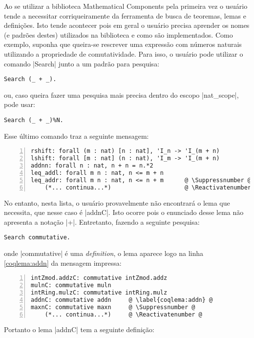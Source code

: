 Ao se utilizar a biblioteca Mathematical Components pela primeira vez o usuário tende a necessitar corriqueiramente da ferramenta de busca de teoremas, lemas e definições. Isto tende acontecer pois em geral o usuário precisa aprender os nomes (e padrões destes) utilizados na biblioteca e como são implementados. Como exemplo, suponha que queira-se rescrever uma expressão com números naturais utilizando a propriedade de comutatividade. Para isso, o usuário pode utilizar o comando \coqinline|Search| junto a um padrão para pesquisa:
    \begin{lstlisting}[language=coq,frame=single,tabsize=1]
Search (_ + _).
    \end{lstlisting}
ou, caso queira fazer uma pesquisa mais precisa dentro do escopo \coqinline|nat_scope|, pode usar:
    \begin{lstlisting}[language=coq,frame=single,tabsize=1]
Search (_ + _)%N.
    \end{lstlisting}
Esse último comando traz a seguinte mensagem:
    \begin{lstlisting}[language=coq-error,frame=single,tabsize=1, escapechar=@, escapechar=@, numbers=left]
rshift: forall (m : nat) [n : nat], 'I_n -> 'I_(m + n)
lshift: forall [m : nat] (n : nat), 'I_m -> 'I_(m + n)
addnn: forall n : nat, n + n = n.*2
leq_addl: forall m n : nat, n <= m + n
leq_addr: forall m n : nat, n <= n + m      @ \Suppressnumber @
    (*... continua...*)                     @ \Reactivatenumber @
    \end{lstlisting}
No entanto, nesta lista, o usuário provavelmente não encontrará o lema que necessita, que nesse caso é \coqinline|addnC|. Isto ocorre pois o enunciado desse lema não apresenta a notação \coqinline|+|. Entretanto, fazendo a seguinte pesquisa:
    \begin{lstlisting}[language=coq,frame=single,tabsize=1]
Search commutative.
    \end{lstlisting}
onde \coqinline|commutative| é uma \textit{definition},
o lema aparece logo na linha \ref{coqlema:addn} da mensagem impressa: 
    \begin{lstlisting}[language=coq-error,frame=single,tabsize=1, escapechar=@, numbers=left]
intZmod.addzC: commutative intZmod.addz
mulnC: commutative muln
intRing.mulzC: commutative intRing.mulz
addnC: commutative addn     @ \label{coqlema:addn} @
maxnC: commutative maxn     @ \Suppressnumber @
    (*... continua...*)     @ \Reactivatenumber @
    \end{lstlisting}
Portanto o lema \coqinline|addnC| tem a seguinte definição:
